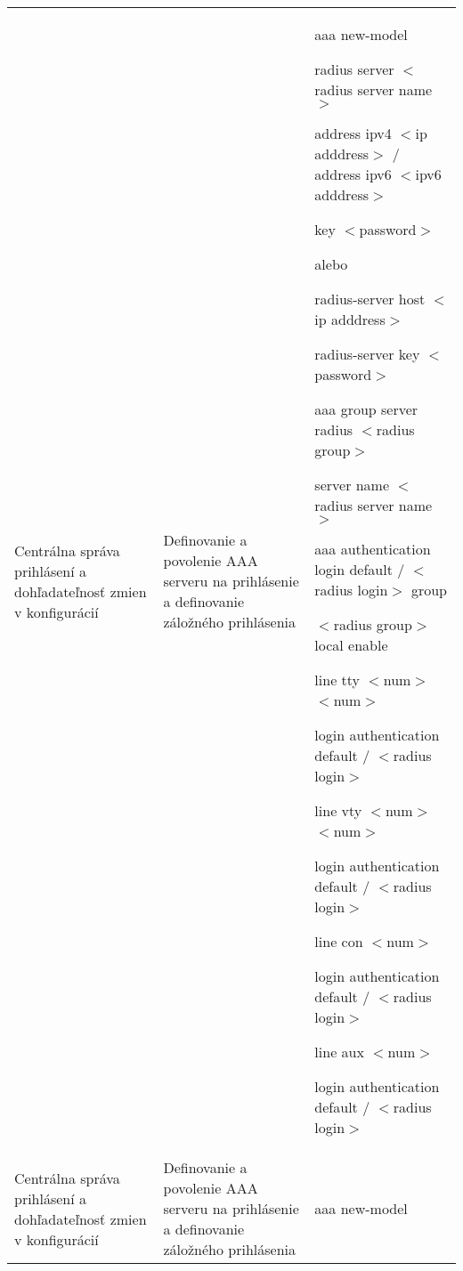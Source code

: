\begin{longtable}[!htbp]{|L{10em}L{10em}>{\selectfont}L{34em}|}
	
	
	Centrálna správa prihlásení a dohľadateľnosť zmien v konfigurácií	&Definovanie a povolenie AAA serveru na prihlásenie a definovanie záložného prihlásenia	&aaa new-model
	
	radius server $<$radius server name$>$
	
	\hspace{0.5em}address ipv4 $<$ip adddress$>$ / address ipv6 $<$ipv6 adddress$>$
	
	\hspace{0.5em}key $<$password$>$
	\vspace{0.5em}
	
	{\selectfont alebo}
	
	\vspace{0.5em}
	radius-server host $<$ip adddress$>$
	
	radius-server key $<$password$>$
	
	\vspace{0.5em}
	
	aaa group server radius $<$radius group$>$
	
	\hspace{0.5em}server name $<$radius server name$>$
	
	aaa authentication login default / $<$radius login$>$ group 
	
	\hspace{0.5em}$<$radius group$>$ local enable
	
	line tty $<$num$>$ $<$num$>$
	
	\hspace{0.5em}login authentication default / $<$radius login$>$
	
	line vty $<$num$>$ $<$num$>$
	
	\hspace{0.5em}login authentication default / $<$radius login$>$
	
	line con $<$num$>$
	
	\hspace{0.5em}login authentication default / $<$radius login$>$
	
	line aux $<$num$>$
	
	
	\hspace{0.5em}login authentication default / $<$radius login$>$\\
	
	
	
	
	 Centrálna správa prihlásení a dohľadateľnosť zmien v konfigurácií	&Definovanie a povolenie AAA serveru na prihlásenie a definovanie záložného prihlásenia	&aaa new-model
	

\end{longtable}
